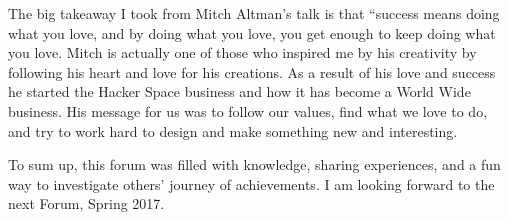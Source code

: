 \documentclass[letterpaper]{article}
\begin{document}
	The big takeaway I took from Mitch Altman’s\parencite{LectureMitch_2017} talk is that “success means doing what you love, and by doing what you love, you get enough to keep doing what you love. Mitch is actually one of those who inspired me by his creativity by following his heart and love for his creations. As a result of his love and success he started the Hacker Space business and how it has become a World Wide business.  His message for us was to follow our values, find what we love to do, and try to work hard to design and make something new and interesting.
    
	To sum up, this forum was filled with knowledge, sharing experiences, and a fun way to investigate others' journey of achievements. I am looking forward to the next Forum, Spring 2017.
 


\printbibliography[title={References and Citations}]
\end{document}
